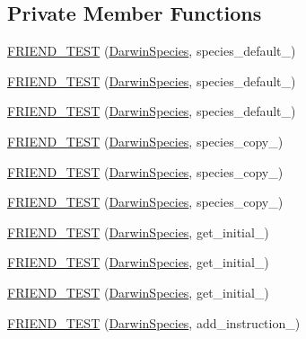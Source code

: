 \subsection*{Private Member Functions}
\begin{DoxyCompactItemize}
\item 
\hyperlink{classSpecies_a12078ee2d699a3c2283d50e6b44ecbcf}{F\-R\-I\-E\-N\-D\-\_\-\-T\-E\-S\-T} (\hyperlink{classSpecies_af0217fd97a80c28ad384672b45583c0f}{Darwin\-Species}, species\-\_\-default\-\_)
\item 
\hyperlink{classSpecies_a058bbc52712fdfcb2dc15b2829d13212}{F\-R\-I\-E\-N\-D\-\_\-\-T\-E\-S\-T} (\hyperlink{classSpecies_af0217fd97a80c28ad384672b45583c0f}{Darwin\-Species}, species\-\_\-default\-\_)
\item 
\hyperlink{classSpecies_a0c95cd632d89242dc577e3e743784801}{F\-R\-I\-E\-N\-D\-\_\-\-T\-E\-S\-T} (\hyperlink{classSpecies_af0217fd97a80c28ad384672b45583c0f}{Darwin\-Species}, species\-\_\-default\-\_)
\item 
\hyperlink{classSpecies_a08ce888e7c2861e410530cc3b71cc629}{F\-R\-I\-E\-N\-D\-\_\-\-T\-E\-S\-T} (\hyperlink{classSpecies_af0217fd97a80c28ad384672b45583c0f}{Darwin\-Species}, species\-\_\-copy\-\_)
\item 
\hyperlink{classSpecies_a92c76d34a923f34b0a457b01ae8e670a}{F\-R\-I\-E\-N\-D\-\_\-\-T\-E\-S\-T} (\hyperlink{classSpecies_af0217fd97a80c28ad384672b45583c0f}{Darwin\-Species}, species\-\_\-copy\-\_)
\item 
\hyperlink{classSpecies_aeae829446fa3cde6549963a80deca2a0}{F\-R\-I\-E\-N\-D\-\_\-\-T\-E\-S\-T} (\hyperlink{classSpecies_af0217fd97a80c28ad384672b45583c0f}{Darwin\-Species}, species\-\_\-copy\-\_)
\item 
\hyperlink{classSpecies_a210bf2b81d436172aa73c63704211cba}{F\-R\-I\-E\-N\-D\-\_\-\-T\-E\-S\-T} (\hyperlink{classSpecies_af0217fd97a80c28ad384672b45583c0f}{Darwin\-Species}, get\-\_\-initial\-\_)
\item 
\hyperlink{classSpecies_ad8bf8caa931e77961553b2d3fb200cf7}{F\-R\-I\-E\-N\-D\-\_\-\-T\-E\-S\-T} (\hyperlink{classSpecies_af0217fd97a80c28ad384672b45583c0f}{Darwin\-Species}, get\-\_\-initial\-\_)
\item 
\hyperlink{classSpecies_a611e985877846d2e5674b0b3f9837f2e}{F\-R\-I\-E\-N\-D\-\_\-\-T\-E\-S\-T} (\hyperlink{classSpecies_af0217fd97a80c28ad384672b45583c0f}{Darwin\-Species}, get\-\_\-initial\-\_)
\item 
\hyperlink{classSpecies_ad32491f26ace00000efac84f318462c0}{F\-R\-I\-E\-N\-D\-\_\-\-T\-E\-S\-T} (\hyperlink{classSpecies_af0217fd97a80c28ad384672b45583c0f}{Darwin\-Species}, add\-\_\-instruction\-\_)

\end{DoxyCompactItemize}
